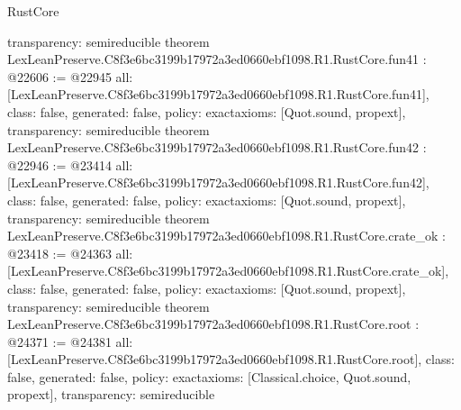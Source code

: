 \begin{lexlean}{RustCore}
\begin{coremodule}
{  transparency: semireducible
}
theorem LexLeanPreserve.C8f3e6bc3199b17972a3ed0660ebf1098.R1.RustCore.fun41 : @22606 := @22945 {
  all: [LexLeanPreserve.C8f3e6bc3199b17972a3ed0660ebf1098.R1.RustCore.fun41],
  class: false,
  generated: false,
  policy: exact{axioms: [Quot.sound, propext]},
  transparency: semireducible
}
theorem LexLeanPreserve.C8f3e6bc3199b17972a3ed0660ebf1098.R1.RustCore.fun42 : @22946 := @23414 {
  all: [LexLeanPreserve.C8f3e6bc3199b17972a3ed0660ebf1098.R1.RustCore.fun42],
  class: false,
  generated: false,
  policy: exact{axioms: [Quot.sound, propext]},
  transparency: semireducible
}
theorem LexLeanPreserve.C8f3e6bc3199b17972a3ed0660ebf1098.R1.RustCore.crate_ok : @23418 := @24363 {
  all: [LexLeanPreserve.C8f3e6bc3199b17972a3ed0660ebf1098.R1.RustCore.crate_ok],
  class: false,
  generated: false,
  policy: exact{axioms: [Quot.sound, propext]},
  transparency: semireducible
}
theorem LexLeanPreserve.C8f3e6bc3199b17972a3ed0660ebf1098.R1.RustCore.root : @24371 := @24381 {
  all: [LexLeanPreserve.C8f3e6bc3199b17972a3ed0660ebf1098.R1.RustCore.root],
  class: false,
  generated: false,
  policy: exact{axioms: [Classical.choice, Quot.sound, propext]},
  transparency: semireducible
}


\end{coremodule}
\end{lexlean}
